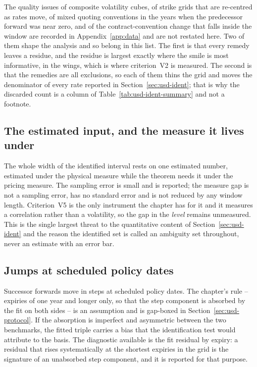 \documentclass[../../../main.tex]{subfiles}
\begin{document}
The quality issues of composite volatility cubes, of strike grids that are re-centred as rates move, of mixed quoting conventions in the years when the predecessor forward was near zero, and of the contract-convention change that falls inside the window are recorded in Appendix~\ref{app:data} and are not restated here. Two of them shape the analysis and so belong in this list. The first is that every remedy leaves a residue, and the residue is largest exactly where the smile is most informative, in the wings, which is where criterion~V2 is measured. The second is that the remedies are all exclusions, so each of them thins the grid and moves the denominator of every rate reported in Section~\ref{sec:usd-ident}; that is why the discarded count is a column of Table~\ref{tab:usd-ident-summary} and not a footnote.

\subsection{The estimated input, and the measure it lives under}

The whole width of the identified interval rests on one estimated number, estimated under the physical measure while the theorem needs it under the pricing measure. The sampling error is small and is reported; the measure gap is not a sampling error, has no standard error and is not reduced by any window length. Criterion~V5 is the only instrument the chapter has for it and it measures a correlation rather than a volatility, so the gap in the \emph{level} remains unmeasured. This is the single largest threat to the quantitative content of Section~\ref{sec:usd-ident} and the reason the identified set is called an ambiguity set throughout, never an estimate with an error bar.

\subsection{Jumps at scheduled policy dates}

Successor forwards move in steps at scheduled policy dates. The chapter's rule -- expiries of one year and longer only, so that the step component is absorbed by the fit on both sides -- is an assumption and is gap-boxed in Section~\ref{sec:usd-protocol}. If the absorption is imperfect and asymmetric between the two benchmarks, the fitted triple carries a bias that the identification test would attribute to the basis. The diagnostic available is the fit residual by expiry: a residual that rises systematically at the shortest expiries in the grid is the signature of an unabsorbed step component, and it is reported for that purpose.
\end{document}
